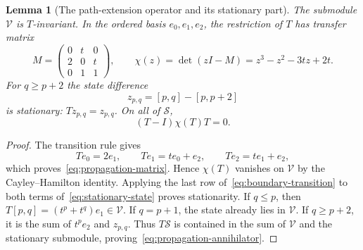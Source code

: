 \documentclass[reqno]{article}
\theoremstyle{plain} %
\newtheorem{lemma}[theorem]{Lemma}
\theoremstyle{definition}
\theoremstyle{remark}
\numberwithin{equation}{section}
\begin{document}
\begin{lemma}[The path-extension operator and its stationary part]
\label{lem:propagation-polynomial}
The submodule \(\mathcal V\) is \(T\)-invariant. In the ordered basis
\(e_0,e_1,e_2\), the restriction of \(T\) has transfer matrix
\begin{equation}
\label{eq:propagation-matrix}
M=\begin{pmatrix}0&t&0\\2&0&t\\0&1&1\end{pmatrix},\qquad
\chi(z)=\det(zI-M)
=z^3-z^2-3tz+2t.
\end{equation}
For \(q\ge p+2\) the state difference
\begin{equation}
\label{eq:stationary-state}
z_{p,q}=[p,q]-[p,p+2]
\end{equation}
is stationary: \(Tz_{p,q}=z_{p,q}\). On all of \(\mathcal S\),
\begin{equation}
\label{eq:propagation-annihilator}
(T-I)\chi(T)T=0.
\end{equation}
\end{lemma}

\begin{proof}
The transition rule gives
\[
Te_0=2e_1,\qquad Te_1=te_0+e_2,\qquad Te_2=te_1+e_2,
\]
which proves~\eqref{eq:propagation-matrix}. Hence \(\chi(T)\) vanishes
on \(\mathcal V\) by the Cayley--Hamilton identity. Applying the
last row of~\eqref{eq:boundary-transition} to both terms
of~\eqref{eq:stationary-state} proves stationarity.
If \(q\le p\), then \(T[p,q]=(t^p+t^q)e_1\in\mathcal V\).
If \(q=p+1\), the state already lies in \(\mathcal V\).
If \(q\ge p+2\), it is the sum of \(t^pe_2\) and \(z_{p,q}\).
Thus \(T\mathcal S\) is contained in the sum of \(\mathcal V\)
and the stationary submodule, proving~\eqref{eq:propagation-annihilator}.
\end{proof}
\end{document}
